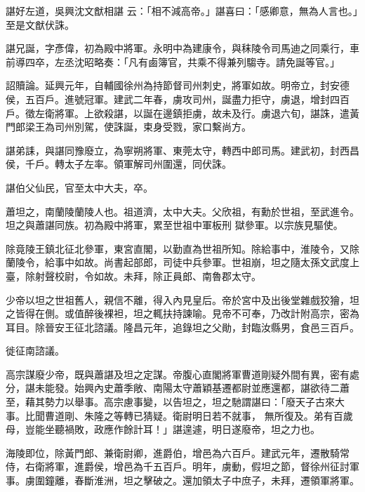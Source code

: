 \begin{pinyinscope}
 諶好左道，吳興沈文猷相諶
 云：「相不減高帝。」諶喜曰：「感卿意，無為人言也。」至是文猷伏誅。



 諶兄誕，字彥偉，初為殿中將軍。永明中為建康令，與秣陵令司馬迪之同乘行，車前導四卒，左丞沈昭略奏：「凡有鹵簿官，共乘不得兼列騶寺。請免誕等官。」



 詔贖論。延興元年，自輔國徐州為持節督司州刺史，將軍如故。明帝立，封安德侯，五百戶。進號冠軍。建武二年春，虜攻司州，誕盡力拒守，虜退，增封四百戶。徵左衛將軍。上欲殺諶，以誕在邊鎮拒虜，故未及行。虜退六旬，諶誅，遣黃門郎梁王為司州別駕，使誅誕，束身受戮，家口繫尚方。



 諶弟誄，與諶同豫廢立，為寧朔將軍、東莞太守，轉西中郎司馬。建武初，封西昌侯，千戶。轉太子左率。領軍解司州圍還，同伏誅。



 諶伯父仙民，官至太中大夫，卒。



 蕭坦之，南蘭陵蘭陵人也。祖道濟，太中大夫。父欣祖，有勳於世祖，至武進令。坦之與蕭諶同族。初為殿中將軍，累至世祖中軍板刑
 獄參軍。以宗族見驅使。



 除竟陵王鎮北征北參軍，東宮直閣，以勤直為世祖所知。除給事中，淮陵令，又除蘭陵令，給事中如故。尚書起部郎，司徒中兵參軍。世祖崩，坦之隨太孫文武度上臺，除射聲校尉，令如故。未拜，除正員郎、南魯郡太守。



 少帝以坦之世祖舊人，親信不離，得入內見皇后。帝於宮中及出後堂雜戲狡獪，坦之皆得在側。或值醉後裸袒，坦之輒扶持諫喻。見帝不可奉，乃改計附高宗，密為耳目。除晉安王征北諮議。隆昌元年，追錄坦之父勛，封臨汝縣男，食邑三百戶。



 徙征南諮議。



 高宗謀廢少帝，既與蕭諶及坦之定謀。帝腹心直閣將軍曹道剛疑外間有異，密有處分，諶未能發。始興內史蕭季敞、南陽太守蕭穎基遷都尉並應還都，諶欲待二蕭至，藉其勢力以舉事。高宗慮事變，以告坦之，坦之馳謂諶曰：「廢天子古來大事。比聞曹道剛、朱隆之等轉已猜疑。衛尉明日若不就事，
 無所復及。弟有百歲母，豈能坐聽禍敗，政應作餘計耳！」諶遑遽，明日遂廢帝，坦之力也。



 海陵即位，除黃門郎、兼衛尉卿，進爵伯，增邑為六百戶。建武元年，遷散騎常侍，右衛將軍，進爵侯，增邑為千五百戶。明年，虜動，假坦之節，督徐州征討軍事。虜圍鐘離，春斷淮洲，坦之擊破之。還加領太子中庶子，未拜，遷領軍將軍。




\end{pinyinscope}
